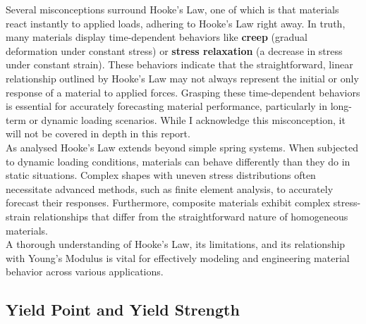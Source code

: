 \documentclass{article}
\begin{document}
Several misconceptions surround Hooke's Law, one of which is that materials react instantly to applied loads, adhering to Hooke's Law right away. In truth, many materials display time-dependent behaviors like \textbf{creep} (gradual deformation under constant stress) or \textbf{stress relaxation} (a decrease in stress under constant strain). These behaviors indicate that the straightforward, linear relationship outlined by Hooke's Law may not always represent the initial or only response of a material to applied forces. Grasping these time-dependent behaviors is essential for accurately forecasting material performance, particularly in long-term or dynamic loading scenarios. While I acknowledge this misconception, it will not be covered in depth in this report. \\[8pt]
As analysed Hooke's Law extends beyond simple spring systems. When subjected to dynamic loading conditions, materials can behave differently than they do in static situations. Complex shapes with uneven stress distributions often necessitate advanced methods, such as finite element analysis, to accurately forecast their responses. Furthermore, composite materials exhibit complex stress-strain relationships that differ from the straightforward nature of homogeneous materials.\\[8pt]
A thorough understanding of Hooke's Law, its limitations, and its relationship with Young's Modulus is vital for effectively modeling and engineering material behavior across various applications.

    
    
    \newpage
\subsection{Yield Point and Yield Strength}
\end{document}
